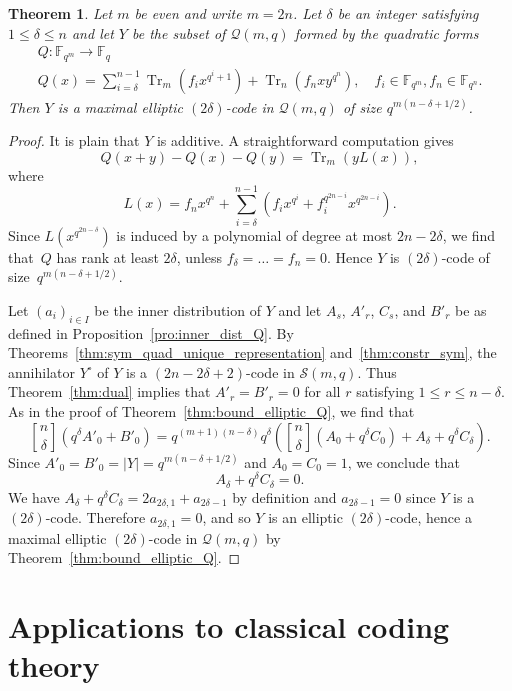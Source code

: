 \documentclass[10pt]{article}
\newtheorem{theorem}{Theorem}[section]
\theoremstyle{definition}
\newcommand{\FF}{\mathbb{F}}
\newcommand{\Q}{\mathscr{Q}}
\renewcommand{\S}{\mathscr{S}}
\renewcommand{\d}{\delta}
\newcommand{\abs}[1]{\lvert#1\rvert}
\DeclareMathOperator{\Tr}{Tr}
\begin{document}
\begin{theorem}
\label{thm:constr_elliptic}
Let $m$ be even and write $m=2n$. Let $\delta$ be an integer satisfying $1\le\delta\le n$ and let $Y$ be the subset of $\Q(m,q)$ formed by the quadratic forms
\begin{gather*}
Q:\FF_{q^m}\to\FF_q\\
Q(x)=\sum_{i=\delta}^{n-1}\Tr_m(f_ix^{q^i+1})+\Tr_n(f_nxy^{q^n}),\quad f_i\in\FF_{q^m},f_n\in\FF_{q^n}.
\end{gather*}
Then $Y$ is a maximal elliptic $(2\delta)$-code in $\Q(m,q)$ of size $q^{m(n-\d+1/2)}$.
\end{theorem}
\begin{proof}
It is plain that $Y$ is additive. A straightforward computation gives
\[
Q(x+y)-Q(x)-Q(y)=\Tr_m(yL(x)),
\]
where
\[
L(x)=f_nx^{q^n}+\sum_{i=\delta}^{n-1}\left(f_ix^{q^i}+f_i^{q^{2n-i}}x^{q^{2n-i}}\right).
\]
Since $L(x^{q^{2n-\delta}})$ is induced by a polynomial of degree at most $2n-2\delta$, we find that~$Q$ has rank at least $2\delta$, unless $f_\delta=\dots=f_n=0$. Hence $Y$ is $(2\delta)$-code of size~$q^{m(n-\delta+1/2)}$. 
\par
Let $(a_i)_{i\in I}$ be the inner distribution of $Y$ and let $A_s$, $A'_r$, $C_s$, and $B'_r$ be as defined in Proposition~\ref{pro:inner_dist_Q}. By Theorems~\ref{thm:sym_quad_unique_representation} and~\ref{thm:constr_sym}, the annihilator $Y^\circ$ of $Y$ is a $(2n-2\delta+2)$-code in $\S(m,q)$. Thus Theorem~\ref{thm:dual} implies that $A'_r=B'_r=0$ for all $r$ satisfying $1\le r\le n-\delta$. As in the proof of Theorem~\ref{thm:bound_elliptic_Q}, we find that
\[
\genfrac{[}{]}{0pt}{}{n}{\delta}(q^\delta A'_0+B'_0)=q^{(m+1)(n-\delta)}q^\delta\left(\genfrac{[}{]}{0pt}{}{n}{\delta}(A_0+q^\delta C_0)+A_\delta+q^\delta C_\delta\right).
\]
Since $A'_0=B'_0=\abs{Y}=q^{m(n-\delta+1/2)}$ and $A_0=C_0=1$, we conclude that
\[
A_\delta+q^\delta C_\delta=0.
\]
We have $A_\delta+q^\delta C_\delta=2a_{2\delta,1}+a_{2\delta-1}$ by definition and $a_{2\delta-1}=0$ since $Y$ is a $(2\delta)$-code. Therefore $a_{2\delta,1}=0$, and so $Y$ is an elliptic $(2\delta)$-code, hence a maximal elliptic $(2\delta)$-code in $\Q(m,q)$ by Theorem~\ref{thm:bound_elliptic_Q}.
\end{proof}

%

\section{Applications to classical coding theory}
\label{sec:applications}
\end{document}
